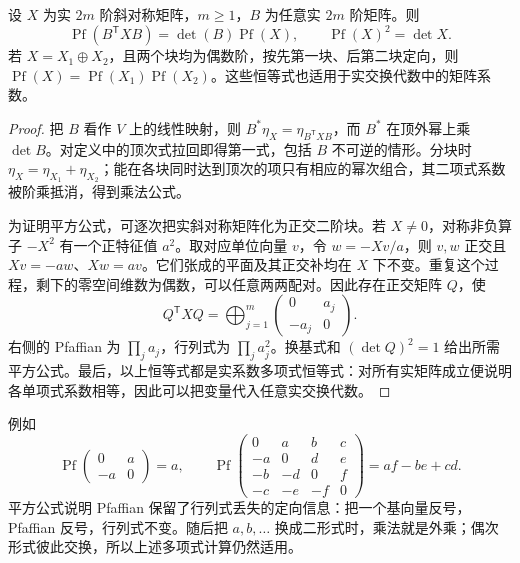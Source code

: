 \begin{proposition}\label{g3:prop:pfaffian-algebra}
	设 \(X\) 为实 \(2m\) 阶斜对称矩阵，\(m\ge1\)，\(B\) 为任意实 \(2m\) 阶矩阵。则
	\begin{equation}\label{g3:eq:pfaffian-change-frame}
		\operatorname{Pf}(B^{\mathsf T}XB)=\det(B)\operatorname{Pf}(X),
		\qquad \operatorname{Pf}(X)^2=\det X.
	\end{equation}
	若 \(X=X_1\oplus X_2\)，且两个块均为偶数阶，按先第一块、后第二块定向，则
	\(\operatorname{Pf}(X)=\operatorname{Pf}(X_1)\operatorname{Pf}(X_2)\)。这些恒等式也适用于实交换代数中的矩阵系数。
\end{proposition}
\begin{proof}
	把 \(B\) 看作 \(V\) 上的线性映射，则 \(B^*\eta_X=\eta_{B^{\mathsf T}XB}\)，而 \(B^*\) 在顶外幂上乘 \(\det B\)。对定义中的顶次式拉回即得第一式，包括 \(B\) 不可逆的情形。分块时 \(\eta_X=\eta_{X_1}+\eta_{X_2}\)；能在各块同时达到顶次的项只有相应的幂次组合，其二项式系数被阶乘抵消，得到乘法公式。

	为证明平方公式，可逐次把实斜对称矩阵化为正交二阶块。若 \(X\ne0\)，对称非负算子 \(-X^2\) 有一个正特征值 \(a^2\)。取对应单位向量 \(v\)，令 \(w=-Xv/a\)，则 \(v,w\) 正交且 \(Xv=-aw\)、\(Xw=av\)。它们张成的平面及其正交补均在 \(X\) 下不变。重复这个过程，剩下的零空间维数为偶数，可以任意两两配对。因此存在正交矩阵 \(Q\)，使
	\[
		Q^{\mathsf T}XQ=\bigoplus_{j=1}^m
		\begin{pmatrix}0&a_j\\-a_j&0\end{pmatrix}.
	\]
	右侧的 Pfaffian 为 \(\prod_j a_j\)，行列式为 \(\prod_j a_j^2\)。换基式和 \((\det Q)^2=1\) 给出所需平方公式。最后，以上恒等式都是实系数多项式恒等式：对所有实矩阵成立便说明各单项式系数相等，因此可以把变量代入任意实交换代数。
\end{proof}

例如
\[
	\operatorname{Pf}\begin{pmatrix}0&a\\-a&0\end{pmatrix}=a,
	\qquad
	\operatorname{Pf}\begin{pmatrix}
		0&a&b&c\\-a&0&d&e\\-b&-d&0&f\\-c&-e&-f&0
	\end{pmatrix}=af-be+cd.
\]
平方公式说明 Pfaffian 保留了行列式丢失的定向信息：把一个基向量反号，Pfaffian 反号，行列式不变。随后把 \(a,b,\ldots\) 换成二形式时，乘法就是外乘；偶次形式彼此交换，所以上述多项式计算仍然适用。

